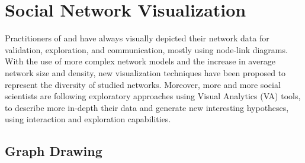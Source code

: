 \section{Social Network Visualization}\label{sec:social-network-visualization}


Practitioners of \sna and \hsna have always visually depicted their network data for validation, exploration, and communication, mostly using node-link diagrams.
With the use of more complex network models and the increase in average network size and density, new visualization techniques have been proposed to represent the diversity of studied networks.
Moreover, more and more social scientists are following exploratory approaches using Visual Analytics (VA) tools, to describe more in-depth their data and generate new interesting hypotheses, using interaction and exploration capabilities.

\subsection{Graph Drawing}

